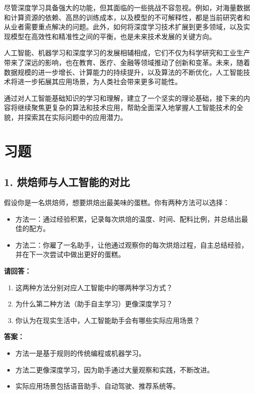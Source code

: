 尽管深度学习具备强大的功能，但其面临的一些挑战不容忽视。例如，对海量数据和计算资源的依赖、高昂的训练成本，以及模型的不可解释性，都是当前研究者和从业者需要重点解决的问题。此外，如何将深度学习技术扩展到更多领域，以及实现模型在高效性和精准性之间的平衡，也是未来技术发展的关键方向。

人工智能、机器学习和深度学习的发展相辅相成，它们不仅为科学研究和工业生产带来了深远的影响，也在教育、医疗、金融等领域推动了创新和变革。未来，随着数据规模的进一步增长、计算能力的持续提升，以及算法的不断优化，人工智能技术将进一步拓展其应用场景，为人类社会带来更多可能性。

通过对人工智能基础知识的学习和理解，建立了一个坚实的理论基础，接下来的内容将继续聚焦更复杂的算法和技术应用，帮助全面深入地掌握人工智能技术的全貌，并探索其在实际问题中的应用潜力。

\section* {习题}

\subsection*{1. 烘焙师与人工智能的对比}
假设你是一名烘焙师，想要烘焙出最美味的蛋糕。你有两种方法可以选择：
\begin{itemize}
    \item 方法一：通过经验积累，记录每次烘焙的温度、时间、配料比例，并总结出最佳的配方。
    \item 方法二：你雇了一名助手，让他通过观察你的每次烘焙过程，自主总结经验，并在下一次尝试中做出更好的蛋糕。
\end{itemize}

\textbf{请回答：}
\begin{enumerate}
    \item 这两种方法分别对应人工智能中的哪两种学习方式？
    \item 为什么第二种方法（助手自主学习）更像深度学习？
    \item 你认为在现实生活中，人工智能助手会有哪些实际应用场景？
\end{enumerate}

\textbf{答案：}
\begin{itemize}
    \item 方法一是基于规则的传统编程或机器学习。
    \item 方法二更像深度学习，因为助手通过大量观察和实践，不断改进。
    \item 实际应用场景包括语音助手、自动驾驶、推荐系统等。
\end{itemize}

